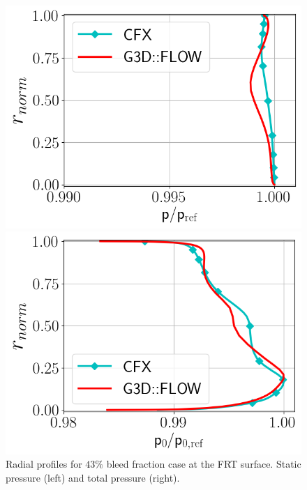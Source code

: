\begin{figure}[h!]
  \centering
  \begin{minipage}{0.48\columnwidth}
  \includegraphics[width=1.\textwidth]{figures/PAaveB40_FRT.png}
  \end{minipage}
  \begin{minipage}{0.48\columnwidth}
  \includegraphics[width=1.\textwidth]{figures/P0MaveB40_FRT.png}
  \end{minipage}
  \caption{Radial profiles for $43\%$ bleed fraction case at the FRT surface. Static pressure (left) and total pressure (right).} \label{fig:FRT40}
\end{figure}
